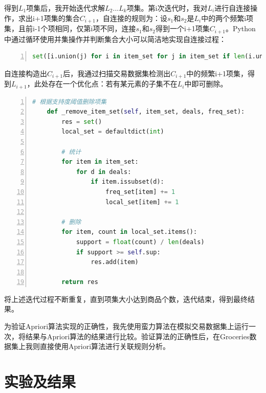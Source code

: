 \documentclass[12pt,a4paper]{article}
\theoremstyle{definition}
\begin{document}
\vspace{0.02\linewidth}
得到$L_1$项集后，我开始迭代求解$L_2...L_k$项集。第i次迭代时，我对$L_i$进行自连接操作，求出i+1项集的集合$C_{i+1}$，自连接的规则为：设$s_1$和$s_2$是$L_i$中的两个频繁i项集，且前i-1个项相同，仅第i项不同，连接$s_1$和$s_2$得到一个i+1项集$C_{i+1}$。Python中通过循环使用并集操作并判断集合大小可以简洁地实现自连接过程：

\vspace{0.02\linewidth}
\begin{lstlisting}[language=Python,
	numbers=left,
	keywordstyle=\color{blue!70},
	frame=shadowbox,
	breaklines=True]
set([i.union(j) for i in item_set for j in item_set if len(i.union(j)) == id])
\end{lstlisting}

\vspace{0.02\linewidth}
自连接构造出$C_{i+1}$后，我通过扫描交易数据集检测出$C_{i+1}$中的频繁i+1项集，得到$L_{i+1}$，此处存在一个优化点：若有某元素的子集不在$L_i$中即可删除。

\vspace{0.02\linewidth}
\begin{lstlisting}[language=Python,
	numbers=left,
	keywordstyle=\color{blue!70},
	frame=shadowbox,
	breaklines=True]
# 根据支持度阈值删除项集
    def _remove_item_set(self, item_set, deals, freq_set):
        res = set()
        local_set = defaultdict(int)

        # 统计
        for item in item_set:
            for d in deals:
                if item.issubset(d):
                    freq_set[item] += 1
                    local_set[item] += 1

        # 删除
        for item, count in local_set.items():
            support = float(count) / len(deals)
            if support >= self.sup:
                res.add(item)

        return res
\end{lstlisting}

\vspace{0.01\linewidth}
将上述迭代过程不断重复，直到项集大小达到商品个数，迭代结束，得到最终结果。

\vspace{0.01\linewidth}
为验证Apriori算法实现的正确性，我先使用蛮力算法在模拟交易数据集上运行一次，将结果与Apriori算法的结果进行比较。验证算法的正确性后，在Groceries数据集上我则直接使用Apriori算法进行关联规则分析。


\section{实验及结果}
\end{document}
